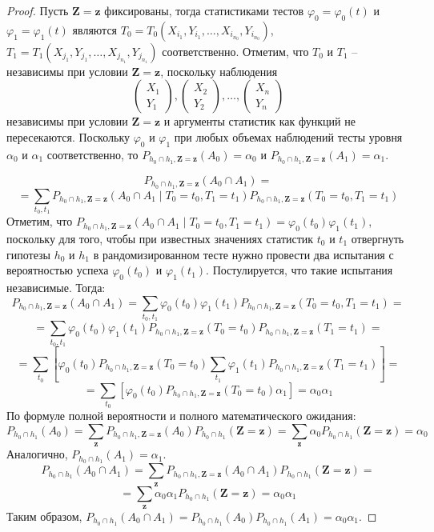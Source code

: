\begin{proof}
    Пусть $\mathbf{Z}=\mathbf{z}$ фиксированы, тогда
    статистиками тестов $\varphi_0=\varphi_0(t)$ и 
    $\varphi_1=\varphi_1(t)$ являются $T_0=T_0(X_{i_1},Y_{i_1},\ldots,X_{i_{n_0}},Y_{i_{n_0}})$,
    $T_1=T_1(X_{j_1},Y_{j_1},\ldots,X_{j_{n_1}},Y_{j_{n_1}})$ соответственно.
    Отметим, что $T_0$ и $T_1$ -- независимы при условии $\mathbf{Z}=\mathbf{z}$, поскольку
    наблюдения
    $$
    \begin{pmatrix}
        X_1 \\
        Y_1
    \end{pmatrix},
    \begin{pmatrix}
        X_2 \\
        Y_2
    \end{pmatrix}, \ldots,
    \begin{pmatrix}
        X_n \\
        Y_n
    \end{pmatrix}
    $$
    независимы при условии $\mathbf{Z}=\mathbf{z}$
    и аргументы статистик как функций не пересекаются.
    Поскольку $\varphi_0$ и $\varphi_1$ при любых объемах наблюдений тесты уровня $\alpha_0$
    и $\alpha_1$ соответственно, то 
    $P_{h_0\cap h_1,\mathbf{Z=z}}(A_0)=\alpha_0$ и 
    $P_{h_0\cap h_1,\mathbf{Z=z}}(A_1)=\alpha_1$.

    $$
    P_{h_0\cap h_1,\mathbf{Z=z}}(A_0 \cap A_1)=
    $$
    $$
    =\sum_{t_0,t_1} P_{h_0\cap h_1,\mathbf{Z=z}}(A_0 \cap A_1 \mid T_0=t_0, T_1=t_1)P_{h_0\cap h_1,\mathbf{Z=z}}(T_0=t_0, T_1=t_1)
    $$
    Отметим, что $P_{h_0\cap h_1,\mathbf{Z=z}}(A_0 \cap A_1 \mid T_0=t_0, T_1=t_1)=\varphi_0(t_0)\varphi_1(t_1)$, поскольку
    для того, чтобы при известных значениях статистик $t_0$ и $t_1$ отвергнуть гипотезы $h_0$ и $h_1$ в рандомизированном тесте нужно провести два испытания с вероятностью успеха
    $\varphi_0(t_0)$ и $\varphi_1(t_1)$. Постулируется, что такие испытания независимые. Тогда:
    $$
    P_{h_0\cap h_1,\mathbf{Z=z}}(A_0 \cap A_1)=\sum_{t_0,t_1} \varphi_0(t_0) \varphi_1(t_1) P_{h_0\cap h_1,\mathbf{Z=z}}(T_0=t_0, T_1=t_1)=
    $$
    $$
    =\sum_{t_0,t_1} \varphi_0(t_0) \varphi_1(t_1) P_{h_0\cap h_1,\mathbf{Z=z}}(T_0=t_0)P_{h_0\cap h_1,\mathbf{Z=z}}(T_1=t_1)=
    $$
    $$
    =\sum_{t_0}[ \varphi_0(t_0) P_{h_0\cap h_1,\mathbf{Z=z}}(T_0=t_0) \sum_{t_1}\varphi_1(t_1) P_{h_0\cap h_1,\mathbf{Z=z}}(T_1=t_1)]=
    $$
    $$
    = \sum_{t_0}[ \varphi_0(t_0) P_{h_0\cap h_1,\mathbf{Z=z}}(T_0=t_0) \alpha_1] 
    =\alpha_0 \alpha_1
    $$
    По формуле полной вероятности и полного математического ожидания:
    $$
    P_{h_0\cap h_1}(A_0) = \sum_{\mathbf{z}} P_{h_0\cap h_1,\mathbf{Z=z}}(A_0) P_{h_0\cap h_1}(\mathbf{Z}=\mathbf{z})
    = \sum_{\mathbf{z}} \alpha_0 P_{h_0\cap h_1}(\mathbf{Z}=\mathbf{z})=\alpha_0
    $$
    Аналогично, $P_{h_0\cap h_1}(A_1)=\alpha_1$.
    $$
    P_{h_0\cap h_1}(A_0 \cap A_1) = \sum_{\mathbf{z}} P_{h_0\cap h_1,\mathbf{Z=z}}(A_0 \cap A_1) P_{h_0\cap h_1}(\mathbf{Z}=\mathbf{z})=
    $$
    $$
    = \sum_{\mathbf{z}} \alpha_0 \alpha_1 P_{h_0\cap h_1}(\mathbf{Z}=\mathbf{z})
    = \alpha_0 \alpha_1
    $$
    Таким образом, $P_{h_0\cap h_1}(A_0 \cap A_1)=P_{h_0\cap h_1}(A_0) P_{h_0\cap h_1}(A_1)=\alpha_0 \alpha_1$.
\end{proof}

